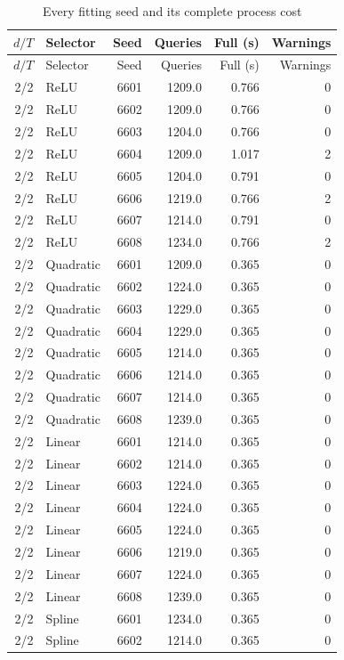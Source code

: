 \begingroup\small\setlength{\tabcolsep}{4pt}
\begin{longtable}{rlrrrr}
\caption{Every fitting seed and its complete process cost}\label{tab:seeds67}\\
\toprule
$d/T$ & Selector & Seed & Queries & Full (s) & Warnings \\
\midrule
\endfirsthead
$d/T$ & Selector & Seed & Queries & Full (s) & Warnings \\
\midrule
\endhead
2/2 & ReLU & 6601 & 1209.0 & 0.766 & 0 \\
2/2 & ReLU & 6602 & 1209.0 & 0.766 & 0 \\
2/2 & ReLU & 6603 & 1204.0 & 0.766 & 0 \\
2/2 & ReLU & 6604 & 1209.0 & 1.017 & 2 \\
2/2 & ReLU & 6605 & 1204.0 & 0.791 & 0 \\
2/2 & ReLU & 6606 & 1219.0 & 0.766 & 2 \\
2/2 & ReLU & 6607 & 1214.0 & 0.791 & 0 \\
2/2 & ReLU & 6608 & 1234.0 & 0.766 & 2 \\
2/2 & Quadratic & 6601 & 1209.0 & 0.365 & 0 \\
2/2 & Quadratic & 6602 & 1224.0 & 0.365 & 0 \\
2/2 & Quadratic & 6603 & 1229.0 & 0.365 & 0 \\
2/2 & Quadratic & 6604 & 1229.0 & 0.365 & 0 \\
2/2 & Quadratic & 6605 & 1214.0 & 0.365 & 0 \\
2/2 & Quadratic & 6606 & 1214.0 & 0.365 & 0 \\
2/2 & Quadratic & 6607 & 1214.0 & 0.365 & 0 \\
2/2 & Quadratic & 6608 & 1239.0 & 0.365 & 0 \\
2/2 & Linear & 6601 & 1214.0 & 0.365 & 0 \\
2/2 & Linear & 6602 & 1214.0 & 0.365 & 0 \\
2/2 & Linear & 6603 & 1224.0 & 0.365 & 0 \\
2/2 & Linear & 6604 & 1224.0 & 0.365 & 0 \\
2/2 & Linear & 6605 & 1224.0 & 0.365 & 0 \\
2/2 & Linear & 6606 & 1219.0 & 0.365 & 0 \\
2/2 & Linear & 6607 & 1224.0 & 0.365 & 0 \\
2/2 & Linear & 6608 & 1239.0 & 0.365 & 0 \\
2/2 & Spline & 6601 & 1234.0 & 0.365 & 0 \\
2/2 & Spline & 6602 & 1214.0 & 0.365 & 0 \\

\end{longtable}
